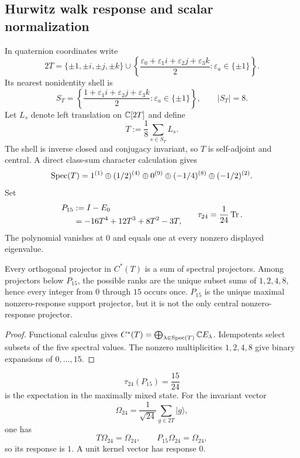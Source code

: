 \documentclass[11pt,a4paper]{article}
\newcommand{\pvcite}[1]{\cite{#1}}
\begin{document}
\subsection{Hurwitz walk response and scalar normalization}
\label{p6:sec:scalar-normalization}

In quaternion coordinates write
\[
2T
=
\{\pm1,\pm i,\pm j,\pm k\}
\cup
\left\{
\frac{\varepsilon_0+\varepsilon_1i+\varepsilon_2j+\varepsilon_3k}{2}
:\varepsilon_a\in\{\pm1\}
\right\}.
\]
Its nearest nonidentity shell is
\[
S_T
=
\left\{
\frac{1+\varepsilon_1i+\varepsilon_2j+\varepsilon_3k}{2}
:\varepsilon_a\in\{\pm1\}
\right\},
\qquad |S_T|=8.
\]
Let \(L_s\) denote left translation on \(\mathbb{C}[2T]\) and define
\[
T:=\frac18\sum_{s\in S_T}L_s .
\]
The shell is inverse closed and conjugacy invariant, so \(T\) is
self-adjoint and central.  A direct class-sum character calculation gives
\pvcite{Kugelmann2026a}
\[
\operatorname{Spec}(T)
=
1^{(1)}\oplus(1/2)^{(4)}\oplus0^{(9)}
\oplus(-1/4)^{(8)}\oplus(-1/2)^{(2)}.
\]
Set
\[
\begin{aligned}
P_{15}
&:=I-E_0\\
&=
-16T^4+12T^3+8T^2-3T,
\end{aligned}
\qquad
\tau_{24}=\frac1{24}\operatorname{Tr} .
\]
The polynomial vanishes at \(0\) and equals one at every nonzero displayed
eigenvalue.

\begin{theorem}
\label{p6:thm:walk-projector-classification}
Every orthogonal projector in \(C^*(T)\) is a sum of spectral projectors.
Among projectors below \(P_{15}\), the possible ranks are the unique subset
sums of \(1,2,4,8\), hence every integer from \(0\) through \(15\) occurs
once.  \(P_{15}\) is the unique maximal nonzero-response support projector,
but it is not the only central nonzero-response projector.
\end{theorem}

\begin{proof}
Functional calculus gives
\(
C^*(T)=\bigoplus_{\lambda\in\operatorname{Spec}(T)}\mathbb{C} E_\lambda
\).
Idempotents select subsets of the five spectral values.  The nonzero
multiplicities \(1,2,4,8\) give binary expansions of \(0,\ldots,15\).
\end{proof}

\begin{theorem}
\label{p6:thm:response-state-dependence}
\[
\tau_{24}(P_{15})=\frac{15}{24}
\]
is the expectation in the maximally mixed state.  For the invariant vector
\[
\Omega_{24}=\frac1{\sqrt{24}}\sum_{g\in2T}|g\rangle,
\]
one has
\[
T\Omega_{24}=\Omega_{24},
\qquad
P_{15}\Omega_{24}=\Omega_{24},
\]
so its response is \(1\).  A unit kernel vector has response \(0\).
\end{theorem}
\end{document}
